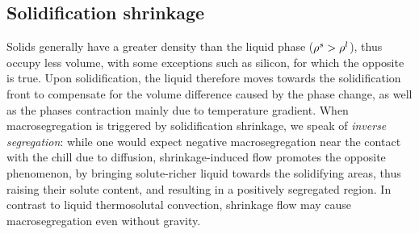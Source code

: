%
%
%
%
% 

\subsection{Solidification shrinkage}
Solids generally have a greater density than the liquid phase ($\rho^s > \rho^l$), 
thus occupy less volume, with some exceptions such as silicon, for which the opposite is true. 
Upon solidification, the liquid therefore moves towards the solidification front to compensate for the volume 
difference caused by the phase change, as well as the phases contraction mainly due to temperature gradient. When macrosegregation is 
triggered by solidification shrinkage, we speak of \emph{inverse segregation}: while one would expect 
negative macrosegregation near the contact with the chill due to diffusion, shrinkage-induced flow 
promotes the opposite phenomenon, by bringing solute-richer liquid towards the solidifying areas, thus raising 
their solute content, and resulting in a positively segregated region.
In contrast to liquid thermosolutal convection, shrinkage flow may cause macrosegregation even without gravity.
%
%

